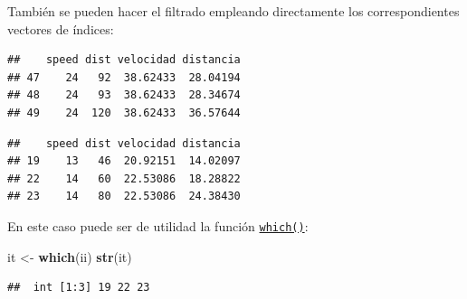 \documentclass[]{book}
\newenvironment{Shaded}{\begin{snugshade}}{\end{snugshade}}
\newcommand{\KeywordTok}[1]{\textcolor[rgb]{0.13,0.29,0.53}{\textbf{#1}}}
\newcommand{\DecValTok}[1]{\textcolor[rgb]{0.00,0.00,0.81}{#1}}
\newcommand{\StringTok}[1]{\textcolor[rgb]{0.31,0.60,0.02}{#1}}
\newcommand{\CommentTok}[1]{\textcolor[rgb]{0.56,0.35,0.01}{\textit{#1}}}
\newcommand{\OperatorTok}[1]{\textcolor[rgb]{0.81,0.36,0.00}{\textbf{#1}}}
\newcommand{\NormalTok}[1]{#1}
\begin{document}
También se pueden hacer el filtrado empleando directamente los
correspondientes vectores de índices:

\begin{Shaded}
\end{Shaded}

\begin{verbatim}
##    speed dist velocidad distancia
## 47    24   92  38.62433  28.04194
## 48    24   93  38.62433  28.34674
## 49    24  120  38.62433  36.57644
\end{verbatim}

\begin{Shaded}
\end{Shaded}

\begin{verbatim}
##    speed dist velocidad distancia
## 19    13   46  20.92151  14.02097
## 22    14   60  22.53086  18.28822
## 23    14   80  22.53086  24.38430
\end{verbatim}

En este caso puede ser de utilidad la función
\href{https://www.rdocumentation.org/packages/base/versions/3.6.1/topics/which}{\texttt{which()}}:

\begin{Shaded}
\begin{Highlighting}[]
\NormalTok{it <-}\StringTok{ }\KeywordTok{which}\NormalTok{(ii)}
\KeywordTok{str}\NormalTok{(it)}
\end{Highlighting}
\end{Shaded}

\begin{verbatim}
##  int [1:3] 19 22 23
\end{verbatim}
\end{document}
